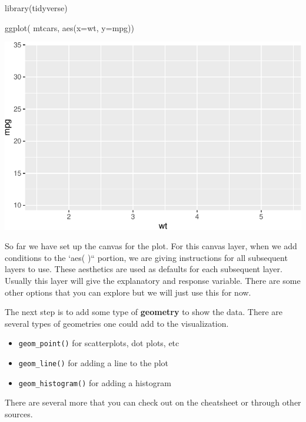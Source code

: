 \documentclass[
  letterpaper,
  DIV=11,
  numbers=noendperiod]{scrreprt}
\newenvironment{Shaded}{\begin{snugshade}}{\end{snugshade}}
\newcommand{\AttributeTok}[1]{\textcolor[rgb]{0.40,0.45,0.13}{#1}}
\newcommand{\FunctionTok}[1]{\textcolor[rgb]{0.28,0.35,0.67}{#1}}
\newcommand{\NormalTok}[1]{\textcolor[rgb]{0.00,0.23,0.31}{#1}}
\providecommand{\tightlist}{%
  \setlength{\itemsep}{0pt}\setlength{\parskip}{0pt}}\usepackage{longtable,booktabs,array}
\begin{document}
\begin{Shaded}
\begin{Highlighting}[]
\FunctionTok{library}\NormalTok{(tidyverse)}

\FunctionTok{ggplot}\NormalTok{( mtcars, }\FunctionTok{aes}\NormalTok{(}\AttributeTok{x=}\NormalTok{wt, }\AttributeTok{y=}\NormalTok{mpg))}
\end{Highlighting}
\end{Shaded}

\includegraphics{Advanced_Scatterplot_Techniques_files/figure-pdf/unnamed-chunk-2-1.pdf}

So far we have set up the canvas for the plot. For this canvas layer,
when we add conditions to the `aes( )`` portion, we are giving
instructions for all subsequent layers to use. These aesthetics are used
as defaults for each subsequent layer. Usually this layer will give the
explanatory and response variable. There are some other options that you
can explore but we will just use this for now.

The next step is to add some type of \textbf{geometry} to show the data.
There are several types of geometries one could add to the
visualization.

\begin{itemize}
\tightlist
\item
  \texttt{geom\_point()} for scatterplots, dot plots, etc
\item
  \texttt{geom\_line()} for adding a line to the plot
\item
  \texttt{geom\_histogram()} for adding a histogram
\end{itemize}

There are several more that you can check out on the cheatsheet or
through other sources.
\end{document}
